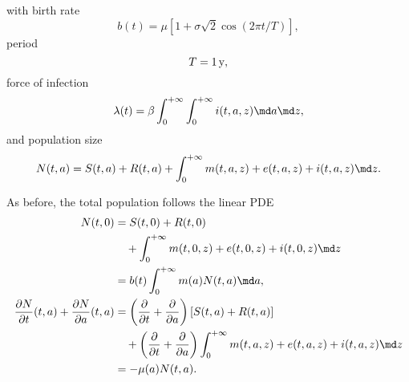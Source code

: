 \documentclass{jpmarticle}
\begin{document}
with birth rate
\begin{equation}
  b(t) = \mu \left[
    1 + \sigma \sqrt{2} \cos\left(2 \pi t / T\right)
  \right],
\end{equation}
period
\begin{equation}
  T = \unit[1]y,
\end{equation}
force of infection
\begin{equation}
  \lambda(t) = \beta \int_0^{+\infty} \int_0^{+\infty}
  i(t, a, z)
  \md a \md z,
\end{equation}
and population size
\begin{equation}
  N(t, a) =
  S(t, a) + R(t, a)
  + \int_0^{+\infty} m(t, a, z) + e(t, a, z) + i(t, a, z) \md z.
\end{equation}



As before, the total population follows the linear PDE
\begin{equation}
  \begin{split}
    N(t, 0) &=
    S(t, 0) + R(t, 0)
    \\ & \quad {}
    + \int_0^{+\infty} m(t, 0, z) + e(t, 0, z) + i(t, 0, z) \md z
    \\
    &=
    b(t) \int_0^{+\infty} m(a) N(t, a) \md a,
    \\
    \frac{\partial N}{\partial t}(t, a)
    + \frac{\partial N}{\partial a}(t, a)
    &=
    \left(\frac{\partial}{\partial t}
      + \frac{\partial}{\partial a}\right)
    \left[S(t, a) + R(t, a)\right]
    \\ & \quad {}
    + \left(\frac{\partial}{\partial t}
      + \frac{\partial}{\partial a}\right)
    \int_0^{+\infty} m(t, a, z) + e(t, a, z) + i(t, a, z) \md z
    \\
    &= - \mu(a) N(t, a).
  \end{split}
\end{equation}


\printbibliography
\end{document}
